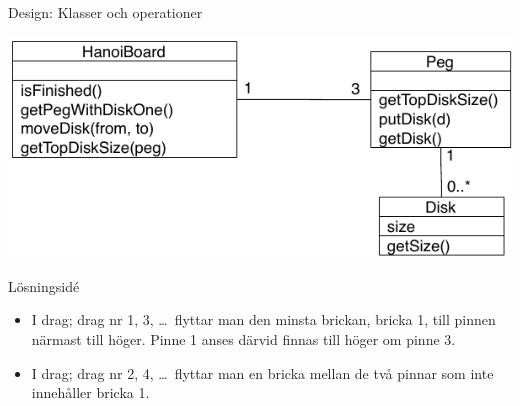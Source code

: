 \documentclass{lecturenotes}
\begin{document}
\begin{Slide}{Design: Klasser och operationer}
\begin{center}
\includegraphics[scale=0.9]{img/hanoi-design.pdf}
\end{center}
\end{Slide} 

\begin{Slide}{Lösningsidé}
\begin{itemize}
 \item I  drag; drag nr 1, 3, \ldots\  flyttar man den minsta brickan, bricka 1, till pinnen närmast till höger. Pinne 1 anses därvid finnas till höger om pinne 3.
 \item I  drag; drag nr 2, 4, \ldots\  flyttar man en bricka mellan de två pinnar som inte innehåller bricka 1.
\end{itemize}
\end{Slide} 


%
%
\end{document}

